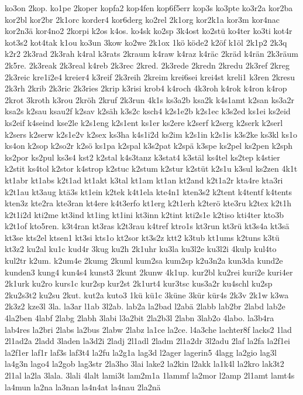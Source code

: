 {ko3on
2kop.
ko1pe
2koper
kopfa2
kop4fen
kop6f5err
kop3s
ko3pte
ko3r2a
kor2ba
kor2bl
kor2br
2k1orc
korder4
kor6derg
ko2rel
2k1org
kor2k1a
kor3m
kor4nac
kor2n3ä
kor4no2
2korpi
k2os
k4os.
ko4sk
ko2sp
3k4ost
ko2stü
ko4ter
ko3ti
kot4r
kot3s2
kot4tak
k1ou
ko3un
3kow
ko2we
2k1ox
1kö
köde2
k2öf
k1öl
2k1p2
2k3q
k2r2
2k3rad
2k3rah
k4ral
k3rats
2kraum
k4raw
k4raz
k4räc
2kräd
k4rän
2k3räum
2k5re.
2k3reak
2k3real
k4reb
2k3rec
2kred.
2k3rede
2kredn
2kredu
2k3ref
2kreg
2k3reic
kre1i2e4
kreier4
k3reif
2k3reih
2kreim
krei6sei
krei4st
kreli1
k3ren
2kresu
2k3rh
2krib
2k3ric
2k3ries
2krip
k3risi
krob4
k4roch
4k3roh
k4rok
k4ron
k4rop
2krot
3kroth
k3rou
2kröh
2kruf
2k3run
4k1s
ks3a2b
ksa2k
k4s1amt
k2san
ks3a2r
ksa2s
k2sau
ksau2f
k2sav
k2säh
k3s2c
ksch4
k2s1e2b
k2s1ec
k3s2ed
ks1ei
ks2eid
ks2eif
k4seind
kse2le
k2s1eng
k2s1ent
ks1er
ks2ere
k2serf
k2serg
k2serk
k2serl
k2sers
k2serw
k2s1e2v
k2sex
ks3ha
k4s1i2d
ks2im
k2s1in
k2s1is
k3s2ke
ks3kl
ks1o
ks4on
k2sop
k2so2r
k2sö
ks1pa
k2spal
k3s2pat
k2spä
k3spe
ks2pel
ks2pen
k2sph
ks2por
ks2pul
ks3s4
kst2
k2stal
k4s3tanz
k3stat4
k3stäl
ks4tel
ks2tep
k4stier
k2stit
ks4tol
k2stor
k4strop
k2stuc
k2stum
k2stur
k2stüt
k2s1u
k3sul
ks2zen
4k1t
kt1abr
kt1abs
k2t1ad
kt1akt
k3tal
kt1am
kt1an
kt2and
k2t1a2r
kta4re
kta3ri
k2t1au
kt3aug
ktä3s
kt1ein
k2tek
k4t1ela
kte4n1
kten3s2
k2tent
k4tentf
k4tents
kten3z
kte2ra
kte3ran
kt4ere
k4t3erfo
kt1erg
k2t1erh
k2terö
kte3ru
k2tex
k2t1h
k2t1i2d
kti2me
kt3ind
kt1ing
kt1ini
kt3inn
k2tint
kti2s1e
k2tiso
kti4ter
kto3b
k2t1of
kto5ren.
k3t4ran
kt3ras
k2t3rau
k4tref
ktro1s
kt3run
kt3rü
kt3s4a
kt3sä
kt3se
kts2el
ktsen1
kt3si
kts1o
kt2sor
kt3s2z
ktt2
k3tub
kt1ums
k2tuns
k3tü
kt3z2
ku2al
ku1c
kud4r
3kug
ku2h
2k1uhr
ku3la
ku3l2e
ku3l2i
4kulp
kul4to
kul2tr
k2um.
k2um4e
2kumg
2kuml
kum2sa
kum2sp
k2u3n2a
kun3da
kund2e
kunden3
kung4
kun4s4
kunst3
2kunt
2kunw
4k1up.
kur2bl
ku2rei
kuri2e
kuri4er
2k1urk
ku2ro
kurs1c
kur2sp
kur2st
2k1urt4
kur3tsc
kus3a2r
ku4schl
ku2sp
2ku2s3t2
ku2su
2kut.
kut2a
kuto3
1kü
kü1c
3küne
3kür
kür4s
2k3v
2k1w
k3wa
2k3z2
kze3l
3la.
la3ar
l1ab
3l2ab.
lab2a
la2bad
l2abä
2labb
lab2br
2labd
lab2e
4la2ben
4labf
2labg
2labh
3labi
l3a2bit
2la2b3l
2labn
3lab2o
4labo.
la3b4ra
lab4res
la2bri
2labs
la2bus
2labw
2labz
la1ce
la2ce.
l4a3che
lachter8f
lacks2
1lad
2l1ad2a
2ladd
3laden
la3d2i
2ladj
2l1adl
2ladm
2l1a2dr
3l2adu
2laf
la2fa
la2f1ei
la2f1er
laf1r
laf3s
laf3t4
la2fu
la2g1a
lag3d
l2ager
lagerin5
4lagg
la2gio
lag3l
la4g3n
lago4
la2gob
lag3str
2la3ho
3lai
lake2
la2kin
l2akk
la1k4l
la2kro
lak3t2
2l1al
la2la
3lala.
3lali
4lalt
lami3t
lam2m1a
1lammf
la2mor
l2amp
2l1amt
lamt4s
la4mun
la2na
la3nan
la4n4at
la4nau
2la2nä
}
